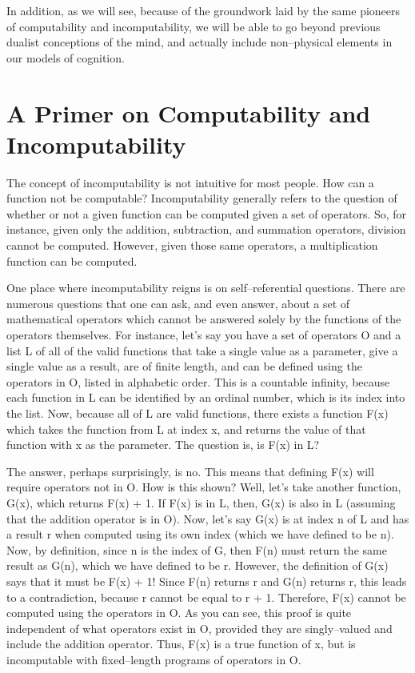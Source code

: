 In addition, as we will see, because of the groundwork laid by the same pioneers of computability and incomputability, we will be able to go beyond previous dualist conceptions of the mind, and actually include non--physical elements in our models of cognition.

\section{A Primer on Computability and Incomputability}

The concept of incomputability is not intuitive for most people.  How can a function not be computable?  Incomputability generally refers to the question of whether or not a given function can be computed given a set of operators.  So, for instance, given only the addition, subtraction, and summation operators, division cannot be computed.  However, given those same operators, a multiplication function can be computed.  

One place where incomputability reigns is on self--referential questions.  There are numerous questions that one can ask, and even answer, about a set of mathematical operators which cannot be answered solely by the functions of the operators themselves.  For instance, let's say you have a set of operators O and a list L of all of the valid functions that take a single value as a parameter, give a single value as a result, are of finite length, and can be defined using the operators in O, listed in alphabetic order.  This is a countable infinity, because each function in L can be identified by an ordinal number, which is its index into the list.  Now, because all of L are valid functions, there exists a function F(x) which takes the function from L at index x, and returns the value of that function with x as the parameter.  The question is, is F(x) in L?  

The answer, perhaps surprisingly, is no.  This means that defining F(x) will require operators not in O.  How is this shown?  Well, let's take another function, G(x), which returns F(x) + 1.  If F(x) is in L, then, G(x) is also in L (assuming that the addition operator is in O).  Now, let's say G(x) is at index n of L and has a result r when computed using its own index (which we have defined to be n).   Now, by definition, since n is the index of G, then F(n) must return the same result as G(n), which we have defined to be r.  However, the definition of G(x) says that it must be F(x) + 1!  Since F(n) returns r and G(n) returns r, this leads to a contradiction, because r cannot be equal to r + 1.  Therefore, F(x) cannot be computed using the operators in O. As you can see, this proof is quite independent of what operators exist in O, provided they are singly--valued and include the addition operator.  Thus, F(x) is a true function of x, but is incomputable with fixed--length programs of operators in O.

